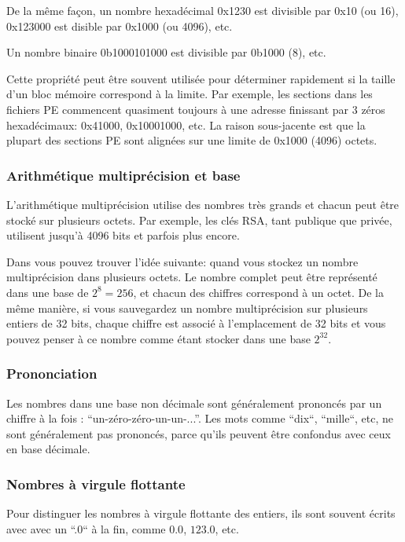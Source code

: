 De la même façon, un nombre hexadécimal 0x1230 est divisible par 0x10 (ou 16), 0x123000 est disible par 0x1000 (ou 4096), etc.

Un nombre binaire 0b1000101000 est divisible par 0b1000 (8), etc.

Cette propriété peut être souvent utilisée pour déterminer rapidement si la taille d'un bloc mémoire correspond à la limite. %
Par exemple, les sections dans les fichiers \ac{PE} commencent quasiment toujours à une adresse finissant par 3 zéros hexadécimaux: 0x41000, 0x10001000, etc.
La raison sous-jacente est que la plupart des sections \ac{PE} sont alignées sur une limite de 0x1000 (4096) octets.

\subsubsection{Arithmétique multiprécision et base}

L'arithmétique multiprécision utilise des nombres très grands et chacun peut être stocké sur plusieurs octets.
Par exemple, les clés RSA, tant publique que privée, utilisent jusqu'à 4096 bits et parfois plus encore.

Dans  vous pouvez trouver l'idée suivante: quand vous stockez un nombre multiprécision
dans plusieurs octets.
Le nombre complet peut être représenté dans une base de $2^8=256$, et chacun des chiffres correspond à un octet.
De la même manière, si vous sauvegardez un nombre multiprécision sur plusieurs entiers de 32 bits, chaque chiffre est associé
 à l'emplacement de 32 bits et vous pouvez penser à ce nombre comme étant stocker dans une base $2^{32}$.

\subsubsection{Prononciation}

Les nombres dans une base non décimale sont généralement prononcés par un chiffre à la fois : ``un-zéro-zéro-un-un-...''.
Les mots comme ``dix``, ``mille``, etc, ne sont généralement pas prononcés, parce qu'ils peuvent être confondus avec ceux en base décimale.

\subsubsection{Nombres à virgule flottante}

Pour distinguer les nombres à virgule flottante des entiers, ils sont souvent écrits avec avec un ``.0`` à la fin,
comme $0.0$, $123.0$, etc.
